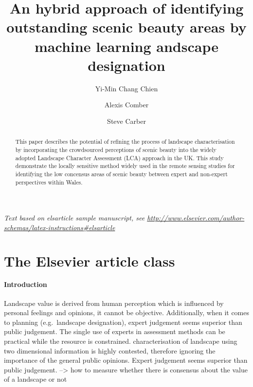 \documentclass[]{elsarticle} %
\begin{document}
\begin{frontmatter}

  \title{An hybrid approach of identifying outstanding scenic beauty areas by
machine learning andscape designation}
    \author[School of Geography, University of Leeds]{Yi-Min Chang Chien}
    \author[School of Geography, University of Leeds]{Alexis Comber}
    \author[School of Geography, University of Leeds]{Steve Carber}
      \address[Some Institute of Technology]{Department, Street, City, State, Zip}
    \address[Another University]{Department, Street, City, State, Zip}
  
  \begin{abstract}
  This paper describes the potential of refining the process of landscape
  characterisation by incorporating the crowdsourced perceptions of scenic
  beauty into the widely adopted Landscape Character Assessment (LCA)
  approach in the UK. This study demonstrate the locally sensitive method
  widely used in the remote sensing studies for identifying the low
  concensus areas of scenic beauty between expert and non-expert
  perspectives within Wales.
  \end{abstract}
  
 \end{frontmatter}

\emph{Text based on elsarticle sample manuscript, see
\url{http://www.elsevier.com/author-schemas/latex-instructions\#elsarticle}}

\hypertarget{the-elsevier-article-class}{%
\section{The Elsevier article class}\label{the-elsevier-article-class}}

\hypertarget{introduction}{%
\paragraph{Introduction}\label{introduction}}

Landscape value is derived from human perception which is influenced by
personal feelings and opinions, it cannot be objective. Additionally,
when it comes to planning (e.g.~landscape designation), expert judgement
seems superior than public judgement. The single use of experts in
assessment methods can be practical while the resource is constrained.
characterisation of landscape using two dimensional information is
highly contested, therefore ignoring the importance of the general
public opinions. Expert judgement seems superior than public judgement.
--\textgreater{} how to measure whether there is consensus about the
value of a landscape or not
\end{document}
